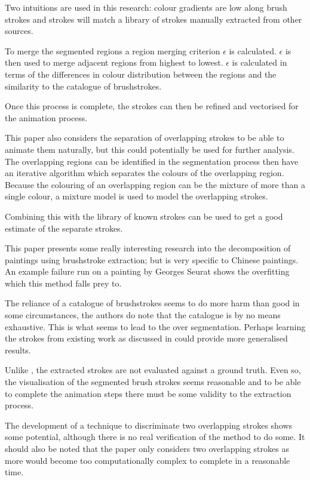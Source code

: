 \documentclass[conference]{IEEEtran}
\begin{document}
Two intuitions are used in this research: colour gradients are low along brush
strokes and strokes will match a library of strokes manually extracted from
other sources. 

To merge the segmented regions a region merging criterion $\epsilon$ is
calculated. $\epsilon$ is then used to merge adjacent regions from highest to
lowest. $\epsilon$ is calculated in terms of the differences in colour
distribution between the regions and the similarity to the catalogue of
brushstrokes.

Once this process is complete, the strokes can then be refined and vectorised
for the animation process.

This paper also considers the separation of overlapping strokes to be able to
animate them naturally, but this could potentially be used for further
analysis. The overlapping regions can be identified in the segmentation process
then have an iterative algorithm which separates the colours of the overlapping
region. Because the colouring of an overlapping region can be the mixture of
more than a single colour, a mixture model is used to model the overlapping
strokes.

Combining this with the library of known strokes can be used to get a good
estimate of the separate strokes.

This paper presents some really interesting research into the decomposition of
paintings using brushstroke extraction; but is very specific to Chinese
paintings. An example failure run on a painting by Georges Seurat shows the
overfitting which this method falls prey to.

The reliance of a catalogue of brushstrokes seems to do more harm than good in
some circumstances, the authors do note that the catalogue is by no means
exhaustive. This is what seems to lead to the over segmentation. Perhaps
learning the strokes from existing work as discussed in \cite{van2010texton}
could provide more generalised results.

Unlike \cite{jia12rhythmic}, the extracted strokes are not evaluated against a
ground truth. Even so, the visualisation of the segmented brush strokes seems
reasonable and to be able to complete the animation steps there must be some
validity to the extraction process.

The development of a technique to discriminate two overlapping strokes shows
some potential, although there is no real verification of the method to do
some. It should also be noted that the paper only considers two overlapping
strokes as more would become too computationally complex to complete in a
reasonable time. 
\end{document}

